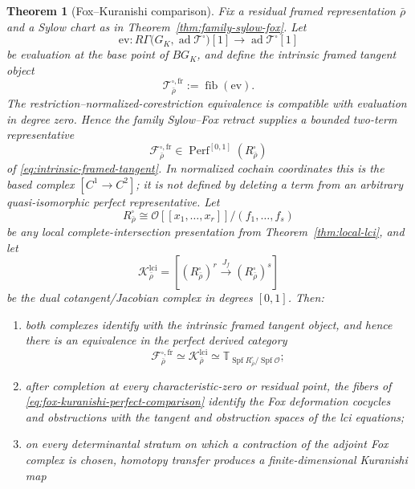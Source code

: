 \documentclass[11pt]{article}
\newtheorem{theorem}{Theorem}[section]
\theoremstyle{definition}
\begin{document}
\begin{theorem}[Fox--Kuranishi comparison]\label{thm:fox-kuranishi-comparison}
Fix a residual framed representation $\bar\rho$ and a Sylow chart as in Theorem~\ref{thm:family-sylow-fox}.  Let
\[
 \mathrm{ev}:R\Gamma
 \bigl(G_K,\operatorname{ad}\mathcal T^{\square}\bigr)[1]
 \longrightarrow
 \operatorname{ad}\mathcal T^{\square}[1]
\]
be evaluation at the base point of $BG_K$, and define the intrinsic framed tangent object
\begin{equation}\label{eq:intrinsic-framed-tangent}
 \mathcal T_{\bar\rho}^{\square,\mathrm{fr}}
 :=
 \operatorname{fib}(\mathrm{ev}).
\end{equation}
The restriction--normalized-corestriction equivalence is compatible with evaluation in degree zero.  Hence the family Sylow--Fox retract supplies a bounded two-term representative
\[
 \mathcal F_{\bar\rho}^{\square,\mathrm{fr}}
 \in
 \operatorname{Perf}^{[0,1]}(R_{\bar\rho}^{\square})
\]
of \eqref{eq:intrinsic-framed-tangent}.  In normalized cochain coordinates this is the based complex
$[C^1\to C^2]$; it is not defined by deleting a term from an arbitrary quasi-isomorphic perfect representative.
Let
\[
 R_{\bar\rho}^{\square}
 \cong
 \mathcal O[[x_1,\ldots,x_r]]/(f_1,\ldots,f_s)
\]
be any local complete-intersection presentation from Theorem~\ref{thm:local-lci}, and let
\[
 \mathcal K_{\bar\rho}^{\mathrm{lci}}
 =
 \left[
 (R_{\bar\rho}^{\square})^r
 \xrightarrow{\ J_f\ }
 (R_{\bar\rho}^{\square})^s
 \right]
\]
be the dual cotangent/Jacobian complex in degrees $[0,1]$.  Then:
\begin{enumerate}[label=\textnormal{(\roman*)}]
\item both complexes identify with the intrinsic framed tangent object, and hence there is an equivalence in the perfect derived category
\begin{equation}\label{eq:fox-kuranishi-perfect-comparison}
 \mathcal F_{\bar\rho}^{\square,\mathrm{fr}}
 \simeq
 \mathcal K_{\bar\rho}^{\mathrm{lci}}
 \simeq
 \mathbb T_{\operatorname{Spf}R_{\bar\rho}^{\square}/\operatorname{Spf}\mathcal O};
\end{equation}
\item after completion at every characteristic-zero or residual point, the fibers of \eqref{eq:fox-kuranishi-perfect-comparison} identify the Fox deformation cocycles and obstructions with the tangent and obstruction spaces of the lci equations;
\item on every determinantal stratum on which a contraction of the adjoint Fox complex is chosen, homotopy transfer produces a finite-dimensional Kuranishi map

\end{enumerate}
\end{theorem}
\end{document}
